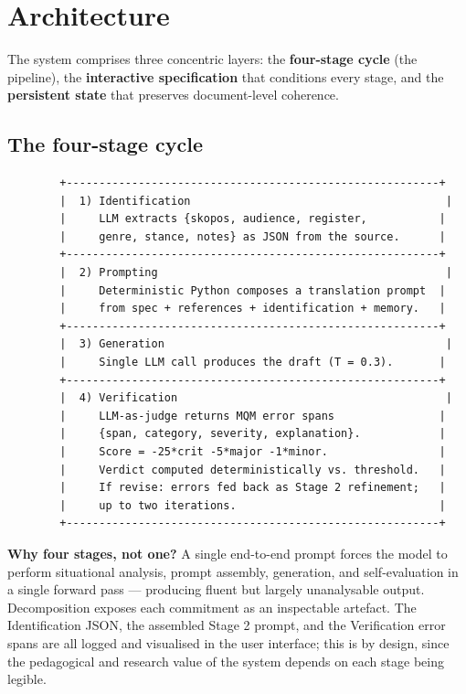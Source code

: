\documentclass[11pt]{article}
\begin{document}
\section{Architecture}

The system comprises three concentric layers: the \textbf{four-stage cycle} (the pipeline), the \textbf{interactive specification} that conditions every stage, and the \textbf{persistent state} that preserves document-level coherence.

\subsection{The four-stage cycle}

\begin{verbatim}
        +---------------------------------------------------------+
        |  1) Identification                                       |
        |     LLM extracts {skopos, audience, register,           |
        |     genre, stance, notes} as JSON from the source.      |
        +---------------------------------------------------------+
        |  2) Prompting                                            |
        |     Deterministic Python composes a translation prompt  |
        |     from spec + references + identification + memory.   |
        +---------------------------------------------------------+
        |  3) Generation                                           |
        |     Single LLM call produces the draft (T = 0.3).       |
        +---------------------------------------------------------+
        |  4) Verification                                         |
        |     LLM-as-judge returns MQM error spans                |
        |     {span, category, severity, explanation}.            |
        |     Score = -25*crit -5*major -1*minor.                 |
        |     Verdict computed deterministically vs. threshold.   |
        |     If revise: errors fed back as Stage 2 refinement;   |
        |     up to two iterations.                               |
        +---------------------------------------------------------+
\end{verbatim}

\textbf{Why four stages, not one?} A single end-to-end prompt forces the model to perform situational analysis, prompt assembly, generation, and self-evaluation in a single forward pass --- producing fluent but largely unanalysable output. Decomposition exposes each commitment as an inspectable artefact. The Identification JSON, the assembled Stage 2 prompt, and the Verification error spans are all logged and visualised in the user interface; this is by design, since the pedagogical and research value of the system depends on each stage being legible.
\end{document}
